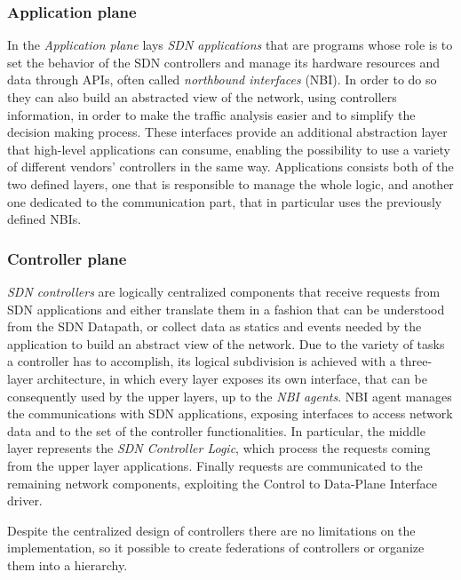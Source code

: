\subsubsection{Application plane}

In the \emph{Application plane} lays \emph{SDN applications} that are programs
whose role is to set the behavior of the SDN controllers 
and manage its hardware resources and data through APIs, often called 
\emph{northbound interfaces} (NBI). In order to do so they can also build an
abstracted view of the network, using controllers information, in order to make
the traffic analysis easier and to simplify the decision making process.
These interfaces provide an additional abstraction layer that high-level 
applications can consume, enabling the possibility to use a variety of 
different vendors' controllers in the same way. Applications consists both of
the two defined layers, one that is responsible to manage the whole logic, and
another one dedicated to the communication part, that in particular uses the
previously defined NBIs.

\subsubsection{Controller plane}

\emph{SDN controllers} are logically centralized components that
receive requests from SDN applications and either translate them 
in a fashion that can be understood from the SDN Datapath, or collect 
data as statics and events needed by the application to build an abstract view
of the network. 
Due to the variety of tasks a controller has to accomplish, its logical 
subdivision is achieved with a three-layer architecture, in which every layer 
exposes its own interface, that can be consequently used by the upper 
layers, up to the \emph{NBI agents}.
NBI agent manages the communications with SDN applications, exposing interfaces
to access network data and to the set of the controller functionalities.
In particular, the middle layer represents the \emph{SDN Controller Logic},
which process the requests coming from the upper layer applications. Finally
requests are communicated to the remaining network components, exploiting the
Control to Data-Plane Interface driver.

Despite the centralized design of controllers there are no limitations on the
implementation, so it possible to create federations of controllers or organize
them into a hierarchy.

